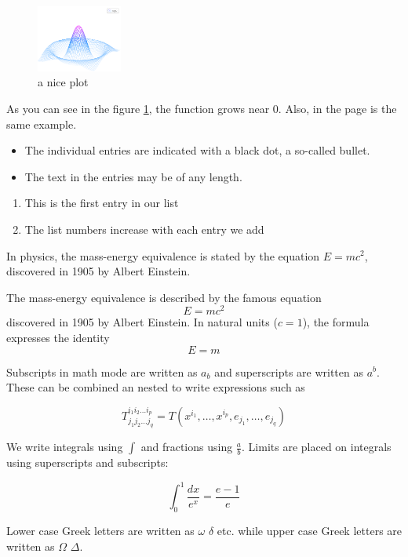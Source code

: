 \documentclass{article}
\begin{document}
\begin{figure}[h]
    \centering
    \includegraphics[width=0.25\textwidth]{mesh}
    \caption{a nice plot}
    \label{fig:mesh1}
\end{figure}

As you can see in the figure \ref{fig:mesh1}, the
function grows near 0. Also, in the page \pageref{fig:mesh1}
is the same example.

\begin{itemize}
  \item The individual entries are indicated with a black dot, a so-called bullet.
  \item The text in the entries may be of any length.
\end{itemize}

\begin{enumerate}
  \item This is the first entry in our list
  \item The list numbers increase with each entry we add
\end{enumerate}

In physics, the mass-energy equivalence is stated
by the equation $E=mc^2$, discovered in 1905 by Albert Einstein.

The mass-energy equivalence is described by the famous equation
\[ E=mc^2 \]
discovered in 1905 by Albert Einstein.
In natural units ($c = 1$), the formula expresses the identity
\begin{equation}
E=m
\end{equation}


Subscripts in math mode are written as $a_b$ and superscripts are written as $a^b$. These can be combined an nested to write expressions such as

\[ T^{i_1 i_2 \dots i_p}_{j_1 j_2 \dots j_q} = T(x^{i_1},\dots,x^{i_p},e_{j_1},\dots,e_{j_q}) \]

We write integrals using $\int$ and fractions using $\frac{a}{b}$. Limits are placed on integrals using superscripts and subscripts:

\[ \int_0^1 \frac{dx}{e^x} =  \frac{e-1}{e} \]

Lower case Greek letters are written as $\omega$ $\delta$ etc. while upper case Greek letters are written as $\Omega$ $\Delta$.
\end{document}
